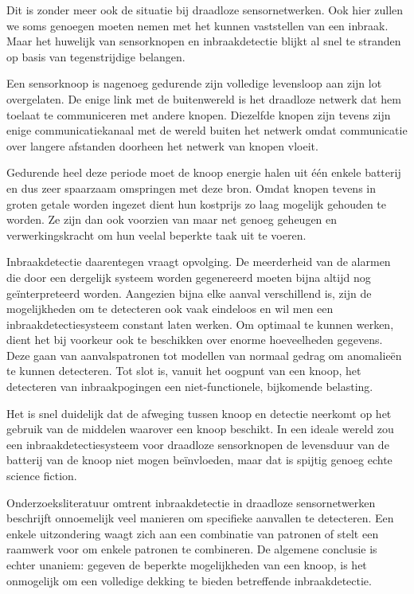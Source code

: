 \documentclass[DIV=calc,paper=a4,fontsize=11pt,twocolumn]{scrartcl}
\begin{document}
Dit is zonder meer ook de situatie bij draadloze sensornetwerken. Ook hier
zullen we soms genoegen moeten nemen met het kunnen vaststellen van een
inbraak. Maar het huwelijk van sensorknopen en inbraakdetectie blijkt al snel
te stranden op basis van tegenstrijdige belangen.

Een sensorknoop is nagenoeg gedurende zijn volledige levensloop aan zijn lot
overgelaten. De enige link met de buitenwereld is het draadloze netwerk dat hem
toelaat te communiceren met andere knopen. Diezelfde knopen zijn tevens zijn
enige communicatiekanaal met de wereld buiten het netwerk omdat communicatie
over langere afstanden doorheen het netwerk van knopen vloeit.

Gedurende heel deze periode moet de knoop energie halen uit \'e\'en enkele
batterij en dus zeer spaarzaam omspringen met deze bron. Omdat knopen tevens in
groten getale worden ingezet dient hun kostprijs zo laag mogelijk gehouden te
worden. Ze zijn dan ook voorzien van maar net genoeg geheugen en
verwerkingskracht om hun veelal beperkte taak uit te voeren.

Inbraakdetectie daarentegen vraagt opvolging. De meerderheid van de alarmen die
door een dergelijk systeem worden gegenereerd moeten bijna altijd nog
ge\"interpreteerd worden. Aangezien bijna elke aanval verschillend is, zijn de
mogelijkheden om te detecteren ook vaak eindeloos en wil men een
inbraakdetectiesysteem constant laten werken. Om optimaal te kunnen werken,
dient het bij voorkeur ook te beschikken over enorme hoeveelheden gegevens.
Deze gaan van aanvalspatronen tot modellen van normaal gedrag om anomalie\"en
te kunnen detecteren. Tot slot is, vanuit het oogpunt van een knoop, het
detecteren van inbraakpogingen een niet-functionele, bijkomende belasting.

Het is snel duidelijk dat de afweging tussen knoop en detectie neerkomt op het
gebruik van de middelen waarover een knoop beschikt. In een ideale wereld zou
een inbraakdetectiesysteem voor draadloze sensorknopen de levensduur van de
batterij van de knoop niet mogen be\"invloeden, maar dat is spijtig genoeg
echte science fiction.

Onderzoeksliteratuur omtrent inbraakdetectie in draadloze sensornetwerken
beschrijft onnoemelijk veel manieren om specifieke aanvallen te detecteren. Een
enkele uitzondering waagt zich aan een combinatie van patronen of stelt een
raamwerk voor om enkele patronen te combineren. De algemene conclusie is echter
unaniem: gegeven de beperkte mogelijkheden van een knoop, is het onmogelijk om
een volledige dekking te bieden betreffende inbraakdetectie.
\end{document}
